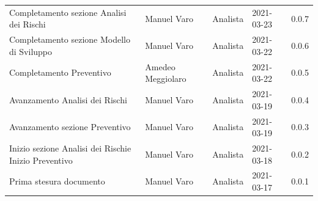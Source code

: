 \documentclass[a4paper]{article}
\begin{document}
\begin{center}
\begin{table}[h!]
\begin{tabular}{p{160px} p{90px} p{70px} p{55px} p{45px}}
        Completamento sezione Analisi dei Rischi                      & Manuel Varo       & Analista       & 2021-03-23    & 0.0.7             \\
        Completamento sezione Modello di Sviluppo                     & Manuel Varo       & Analista       & 2021-03-22    & 0.0.6             \\
        Completamento Preventivo                                      & Amedeo Meggiolaro & Analista       & 2021-03-22    & 0.0.5             \\
        Avanzamento Analisi dei Rischi                                & Manuel Varo       & Analista       & 2021-03-19    & 0.0.4             \\
        Avanzamento sezione Preventivo                                & Manuel Varo       & Analista       & 2021-03-19    & 0.0.3             \\
        Inizio sezione Analisi dei Rischi\newline e Inizio Preventivo & Manuel Varo       & Analista       & 2021-03-18    & 0.0.2             \\
        Prima stesura documento                                       & Manuel Varo       & Analista       & 2021-03-17    & 0.0.1             \\
    \end{tabular}
\end{table}

\end{center}

\newpage
\tableofcontents
\newpage
\newpage
\listoffigures
\newpage
\newpage
\listoftables
\newpage






\appendix


\end{document}

